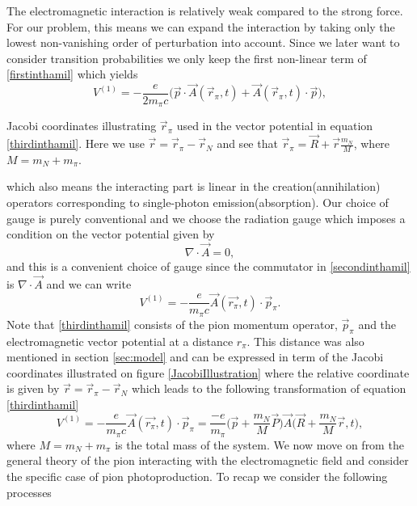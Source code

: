 The electromagnetic interaction is relatively weak compared to the strong force. For our problem, this means we can expand the interaction by taking only the lowest non-vanishing order of perturbation into account. Since we later want to consider transition probabilities we only keep the first non-linear term of \eqref{firstinthamil} which yields
\begin{equation}\label{secondinthamil}
	V^{(1)} = -\frac{e}{2m_\pi c}\bigg( \vec{p}\cdot \vec{A}(\vec{r}_\pi,t)+\vec{A}(\vec{r}_\pi,t)\cdot \vec{p}\bigg),
\end{equation}
\begin{marginfigure}
	\centering
	
	\caption{Jacobi coordinates illustrating $\vec{r}_\pi$ used in the vector potential in equation \ref{thirdinthamil}. Here we use $\vec{r}=\vec{r}_\pi-\vec{r}_N$ and see that $\vec{r}_\pi = \vec{R}+\vec{r}\frac{m_N}{M}$, where $M=m_N+m_\pi$.}
	\label{JacobiIllustration}
\end{marginfigure}
\noindent which also means the interacting part is linear in the creation(annihilation) operators corresponding to single-photon emission(absorption). Our choice of gauge is purely conventional and we choose the radiation gauge which imposes a condition on the vector potential given by
\begin{equation}
	\nabla \cdot \vec{A} = 0,
\end{equation}
and this is a convenient choice of gauge since the commutator in \eqref{secondinthamil} is $\nabla \cdot \vec{A}$ and we can write
\begin{equation}\label{thirdinthamil}
	V^{(1)} = -\frac{e}{m_\pi c}\vec{A}(\vec{r_\pi},t)\cdot \vec{p}_\pi. 
\end{equation}
Note that \eqref{thirdinthamil} consists of the pion momentum operator, $\vec{p}_\pi$ and the electromagnetic vector potential at a distance $r_\pi$. This distance was also mentioned in section \ref{sec:model} and can be expressed in term of the Jacobi coordinates illustrated on figure \ref{JacobiIllustration} where the relative coordinate is given by $\vec{r}=\vec{r}_\pi-\vec{r}_N$ which leads to the following transformation of equation \eqref{thirdinthamil}
\begin{equation}
	V^{(1)} = -\frac{e}{m_\pi c}\vec{A}(\vec{r_\pi},t)\cdot \vec{p}_\pi = \frac{-e}{m_\pi} \bigg( \vec{p}+\frac{m_N}{M}\vec{P}\bigg)\vec{A}\bigg(\vec{R}+\frac{m_N}{M}\vec{r},t\bigg),
\end{equation}
where $M=m_N+m_\pi$ is the total mass of the system. We now move on from the general theory of the pion interacting with the electromagnetic field and consider the specific case of pion photoproduction. To recap we consider the following processes
